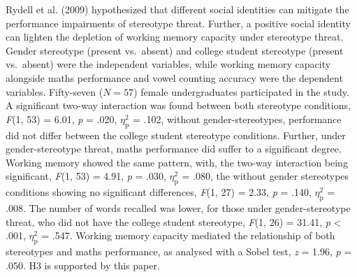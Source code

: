 \documentclass[
  stu, a4paper,floatsintext]{apa7}
\begin{document}
Rydell et al. (2009) hypothesized that different social identities can mitigate the performance impairments of stereotype threat.
Further, a positive social identity can lighten the depletion of working memory capacity under stereotype threat.\\
Gender stereotype (present vs.~absent) and college student stereotype (present vs.~absent) were the independent variables, while working memory capacity alongside maths performance and vowel counting accuracy were the dependent variables.
Fifty-seven (\(N = 57\)) female undergraduates participated in the study.
A significant two-way interaction was found between both stereotype conditions, \emph{F}(1, 53) = 6.01, \emph{p} = .020, \(\eta^{2}_{\text{p}}\) = .102, without gender-stereotypes, performance did not differ between the college student stereotype conditions.
Further, under gender-stereotype threat, maths performance did suffer to a significant degree.
Working memory showed the same pattern, with, the two-way interaction being significant, \emph{F}(1, 53) = 4.91, \emph{p} = .030, \(\eta^{2}_{\text{p}}\) = .080, the without gender stereotypes conditions showing no significant differences, \emph{F}(1, 27) = 2.33, \emph{p} = .140, \(\eta^{2}_{\text{p}}\) = .008.
The number of words recalled was lower, for those under gender-stereotype threat, who did not have the college student stereotype, \emph{F}(1, 26) = 31.41, \emph{p} \textless{} .001, \(\eta^{2}_{\text{p}}\) = .547.
Working memory capacity mediated the relationship of both stereotypes and maths performance, as analysed with a Sobel test, \emph{z} = 1.96, \emph{p} = .050.
H3 is supported by this paper.
\end{document}
